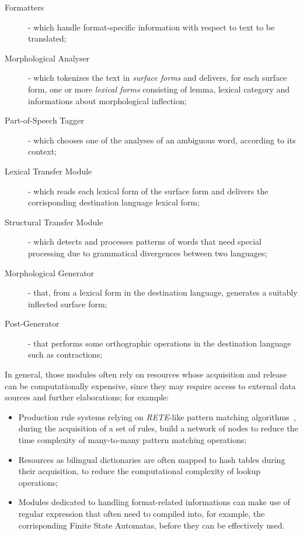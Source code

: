 \documentclass[11pt]{article}
\begin{document}
\begin{description}
 \item[Formatters] - which handle format-specific information with respect to text to be translated;
 \item[Morphological Analyser] - which tokenizes the text in \emph{surface forms} and delivers, for each surface form, one or more \emph{lexical forms} consisting of lemma, lexical category and informations about morphological inflection;
 \item[Part-of-Speech Tagger] - which chooses one of the analyses of an ambiguous word, according to its context;
 \item[Lexical Transfer Module] - which reads each lexical form of the surface form and delivers the corrisponding destination language lexical form;
 \item[Structural Transfer Module] - which detects and processes patterns of words that need special processing due to grammatical divergences between two languages;
 \item[Morphological Generator] - that, from a lexical form in the destination language, generates a suitably inflected surface form;
 \item[Post-Generator] - that performs some orthographic operations in the destination language such as contractions;
\end{description}

In general, those modules often rely on resources whose acquisition and release can be computationally expensive, since they may require access to external data sources and further elaborations; for example:

\begin{itemize}
 \item Production rule systems relying on \emph{RETE}-like pattern matching algorithms~\citep{forgy}, during the acquisition of a set of rules, build a network of nodes to reduce the time complexity of many-to-many pattern matching operations;
 \item Resources as bilingual dictionaries are often mapped to hash tables during their acquisition, to reduce the computational complexity of lookup operations;
 \item Modules dedicated to handling format-related informations can make use of regular expression that often need to compiled into, for example, the corrisponding Finite State Automatas, before they can be effectively used.
\end{itemize}
\end{document}
